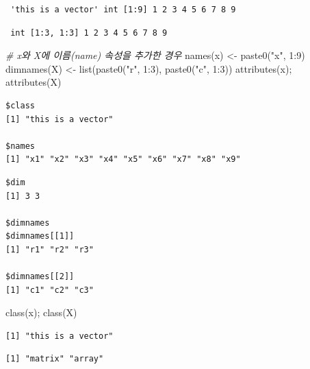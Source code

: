 \documentclass[
  11pt,
]{krantz}
\newenvironment{Shaded}{\begin{snugshade}}{\end{snugshade}}
\newcommand{\CommentTok}[1]{\textcolor[rgb]{0.37,0.37,0.37}{\textit{#1}}}
\newcommand{\DecValTok}[1]{\textcolor[rgb]{0.06,0.06,0.06}{#1}}
\newcommand{\FunctionTok}[1]{\textcolor[rgb]{0,0,0}{#1}}
\newcommand{\NormalTok}[1]{#1}
\newcommand{\OtherTok}[1]{\textcolor[rgb]{0.37,0.37,0.37}{#1}}
\newcommand{\SpecialCharTok}[1]{\textcolor[rgb]{0,0,0}{#1}}
\newcommand{\StringTok}[1]{\textcolor[rgb]{0.5,0.5,0.5}{#1}}
\begin{document}
\begin{verbatim}
 'this is a vector' int [1:9] 1 2 3 4 5 6 7 8 9
\end{verbatim}

\begin{verbatim}
 int [1:3, 1:3] 1 2 3 4 5 6 7 8 9
\end{verbatim}

\begin{Shaded}
\begin{Highlighting}[]
\CommentTok{\# x와 X에 이름(name) 속성을 추가한 경우}
\FunctionTok{names}\NormalTok{(x) }\OtherTok{\textless{}{-}} \FunctionTok{paste0}\NormalTok{(}\StringTok{"x"}\NormalTok{, }\DecValTok{1}\SpecialCharTok{:}\DecValTok{9}\NormalTok{)}
\FunctionTok{dimnames}\NormalTok{(X) }\OtherTok{\textless{}{-}} \FunctionTok{list}\NormalTok{(}\FunctionTok{paste0}\NormalTok{(}\StringTok{"r"}\NormalTok{, }\DecValTok{1}\SpecialCharTok{:}\DecValTok{3}\NormalTok{), }
                    \FunctionTok{paste0}\NormalTok{(}\StringTok{"c"}\NormalTok{, }\DecValTok{1}\SpecialCharTok{:}\DecValTok{3}\NormalTok{))}
\FunctionTok{attributes}\NormalTok{(x); }\FunctionTok{attributes}\NormalTok{(X)}
\end{Highlighting}
\end{Shaded}

\begin{verbatim}
$class
[1] "this is a vector"

$names
[1] "x1" "x2" "x3" "x4" "x5" "x6" "x7" "x8" "x9"
\end{verbatim}

\begin{verbatim}
$dim
[1] 3 3

$dimnames
$dimnames[[1]]
[1] "r1" "r2" "r3"

$dimnames[[2]]
[1] "c1" "c2" "c3"
\end{verbatim}

\begin{Shaded}
\begin{Highlighting}[]
\FunctionTok{class}\NormalTok{(x); }\FunctionTok{class}\NormalTok{(X)}
\end{Highlighting}
\end{Shaded}

\begin{verbatim}
[1] "this is a vector"
\end{verbatim}

\begin{verbatim}
[1] "matrix" "array" 
\end{verbatim}
\end{document}
